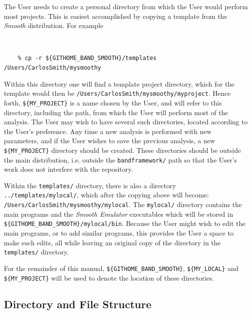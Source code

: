 \documentclass[UserManual.tex]{subfiles}
\begin{document}
The User needs to create a personal directory from which the User would perform most projects. This is easiest accomplished by copying a template from the {\it Smooth} distribution. For example
{\tt
\begin{verbatim}
    % cp -r ${GITHOME_BAND_SMOOTH}/templates /Users/CarlosSmith/mysmoothy
\end{verbatim}
}
Within this directory one will find a template project directory, which for the template would then be {\tt /Users/CarlosSmith/mysmoothy/myproject}. 
Hence forth, {\tt \$\{MY\_PROJECT\}} is a name chosen by the User, and will refer to this directory, including the path, from which the User will perform most of the analysis. The User may wish to have several such directories, located according to the User's preference. Any time a new analysis is performed with new parameters, and if the User wishes to save the previous analysis, a new {\tt \$\{MY\_PROJECT\}} directory should be created. These directories should be outside the main distribution, i.e. outside the {\tt bandframework/} path so that the User's work does not interfere with the repository. 

Within the {\tt templates/} directory, there is also a directory {\tt ../templates/mylocal/}, which after the copying above will become: {\tt /Users/CarlosSmith/mysmoothy/mylocal}. The {\tt mylocal/} directory contains the main programs and the {\it Smooth Emulator} executables which will be stored in {\tt \$\{GITHOME\_BAND\_SMOOTH\}/mylocal/bin}. Because the User might wish to edit the main programs, or to add similar programs, this provides the User a space to make such edits, all while leaving an original copy of the directory in the {\tt templates/} directory. 

For the remainder of this manual, {\tt \$\{GITHOME\_BAND\_SMOOTH\}}, {\tt \$\{MY\_LOCAL\}} and {\tt \$\{MY\_PROJECT\}} will be used to denote the location of these directories.

\subsection{Directory and File Structure}
\end{document}
